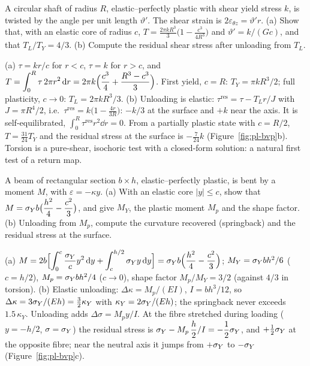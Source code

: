 \label{exo:pl-torsion}
%
A circular shaft of radius $R$, elastic--perfectly plastic with shear yield
stress $k$, is twisted by the angle per unit length $\vartheta'$. The shear
strain is $2\varepsilon_{\theta z}=\vartheta'r$. (a) Show that, with an elastic core
of radius $c$, $\displaystyle T=\frac{2\pi kR^3}{3}\bigl(1-\frac{c^3}{4R^3}\bigr)$ and
$\vartheta'=k/(Gc)$, and that $T_L/T_Y=4/3$. (b) Compute the residual shear
stress after unloading from $T_L$.
\begin{solution}
(a) $\tau=kr/c$ for $r<c$, $\tau=k$ for $r>c$, and
$\displaystyle T=\int_0^R\tau\,2\pi r^2\,\mathrm{d} r=2\pi k\Bigl(\frac{c^3}{4}+\frac{R^3-c^3}{3}\Bigr)$.
First yield, $c=R$: $T_Y=\pi kR^3/2$; full plasticity, $c\to0$:
$T_L=2\pi kR^3/3$. (b) Unloading is elastic:
$\tau^{\mathrm{res}}=\tau-T_Lr/J$ with $J=\pi R^4/2$, i.e.\
$\displaystyle \tau^{\mathrm{res}}=k\bigl(1-\frac{4r}{3R}\bigr)$: $-k/3$ at the surface and
$+k$ near the axis. It is self-equilibrated,
$\displaystyle \int_0^R\tau^{\mathrm{res}}r^2\dd r=0$. From a partially plastic state
with $c=R/2$, $T=\tfrac{31}{24}T_Y$ and the residual stress at the surface is
$-\tfrac{7}{24}k$ (Figure~\ref{fig:pl-bvp}b). Torsion is a pure-shear,
isochoric test with a closed-form solution: a natural first test of a return
map.
\end{solution}

\label{exo:pl-bending}
\index{bending!elastic--plastic}\index{springback}%
A beam of rectangular section $b\times h$, elastic--perfectly plastic, is bent
by a moment $M$, with $\varepsilon=-\kappa y$. (a) With an elastic core
$|y|\le c$, show that $\displaystyle M=\sigma_{Y} b\bigl(\frac{h^2}{4}-\frac{c^2}{3}\bigr)$, and give
$M_Y$, the plastic moment $M_p$ and the shape factor. (b) Unloading from
$M_p$, compute the curvature recovered (springback) and the residual stress
at the surface.
\begin{solution}
(a) $\displaystyle M=2b\Bigl[\int_0^c\frac{\sigma_{Y}}{c}y^2\,\mathrm{d} y+\int_c^{h/2}\sigma_{Y} y\,\mathrm{d} y\Bigr]
=\sigma_{Y} b\Bigl(\frac{h^2}{4}-\frac{c^2}{3}\Bigr)$; $M_Y=\sigma_{Y} bh^2/6$ ($c=h/2$),
$M_p=\sigma_{Y} bh^2/4$ ($c\to0$), shape factor $M_p/M_Y=3/2$ (against $4/3$ in
torsion). (b) Elastic unloading: $\Delta\kappa=M_p/(EI)$, $I=bh^3/12$, so
$\Delta\kappa=3\sigma_{Y}/(Eh)=\tfrac32\kappa_Y$ with $\kappa_Y=2\sigma_{Y}/(Eh)$; the
springback never exceeds $1.5\,\kappa_Y$. Unloading adds
$\Delta\sigma=M_py/I$. At the fibre stretched during loading
($y=-h/2$, $\sigma=\sigma_{Y}$) the residual stress is
$\displaystyle \sigma_{Y}-M_p\,\frac h2/I=-\frac12\sigma_{Y}$, and $+\tfrac12\sigma_{Y}$ at the opposite
fibre; near the neutral axis it jumps from $+\sigma_{Y}$ to $-\sigma_{Y}$
(Figure~\ref{fig:pl-bvp}c).
\end{solution}

